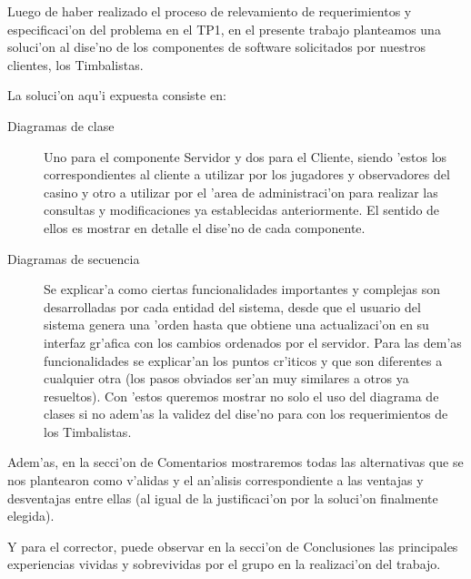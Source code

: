 Luego de haber realizado el proceso de relevamiento de requerimientos y especificaci'on del problema en el TP1, en el presente trabajo planteamos una soluci'on al dise'no de los componentes de software solicitados por nuestros clientes, los Timbalistas. 

La soluci'on aqu'i expuesta consiste en:

\begin{description}
\item[Diagramas de clase] Uno para el componente Servidor y dos para el Cliente, siendo 'estos los correspondientes al cliente a utilizar por los jugadores y observadores del casino y otro a utilizar por el 'area de administraci'on para realizar las consultas y modificaciones ya establecidas anteriormente. El sentido de ellos es mostrar en detalle el dise'no de cada componente.
\item[Diagramas de secuencia] Se explicar'a como ciertas funcionalidades importantes y complejas son desarrolladas por cada entidad del sistema, desde que el usuario del sistema genera una 'orden hasta que obtiene una actualizaci'on en su interfaz gr'afica con los cambios ordenados por el servidor. Para las dem'as funcionalidades se explicar'an los puntos cr'iticos y que son diferentes a cualquier otra (los pasos obviados ser'an muy similares a otros ya resueltos). Con 'estos queremos mostrar no solo el uso del diagrama de clases si no adem'as la validez del dise'no para con los requerimientos de los Timbalistas.
\end{description}

Adem'as, en la secci'on de Comentarios mostraremos todas las alternativas que se nos plantearon como v'alidas y el an'alisis correspondiente a las ventajas y desventajas entre ellas (al igual de la justificaci'on por la soluci'on finalmente elegida).

Y para el corrector, puede observar en la secci'on de Conclusiones las principales experiencias vividas y sobrevividas por el grupo en la realizaci'on del trabajo.
